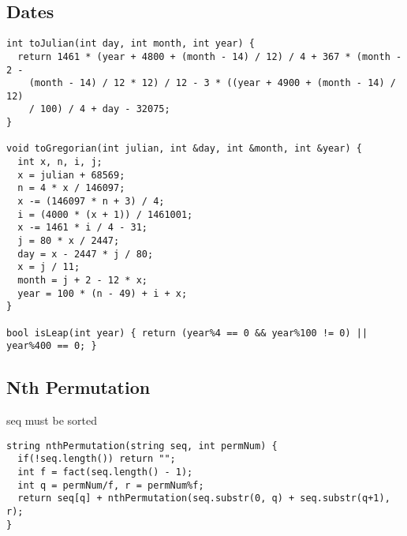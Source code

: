 \documentclass[11pt, oneside]{article}
\begin{document}
\subsection{Dates}
\begin{lstlisting}
int toJulian(int day, int month, int year) {
  return 1461 * (year + 4800 + (month - 14) / 12) / 4 + 367 * (month - 2 -
    (month - 14) / 12 * 12) / 12 - 3 * ((year + 4900 + (month - 14) / 12)
    / 100) / 4 + day - 32075;
}

void toGregorian(int julian, int &day, int &month, int &year) {
  int x, n, i, j;
  x = julian + 68569;
  n = 4 * x / 146097;
  x -= (146097 * n + 3) / 4;
  i = (4000 * (x + 1)) / 1461001;
  x -= 1461 * i / 4 - 31;
  j = 80 * x / 2447;
  day = x - 2447 * j / 80;
  x = j / 11;
  month = j + 2 - 12 * x;
  year = 100 * (n - 49) + i + x;
}

bool isLeap(int year) { return (year%4 == 0 && year%100 != 0) || year%400 == 0; }
\end{lstlisting}

\subsection{Nth Permutation}
seq must be sorted
\begin{lstlisting}
string nthPermutation(string seq, int permNum) {
  if(!seq.length()) return "";
  int f = fact(seq.length() - 1);
  int q = permNum/f, r = permNum%f;
  return seq[q] + nthPermutation(seq.substr(0, q) + seq.substr(q+1), r);
}
\end{lstlisting}
\end{document}
